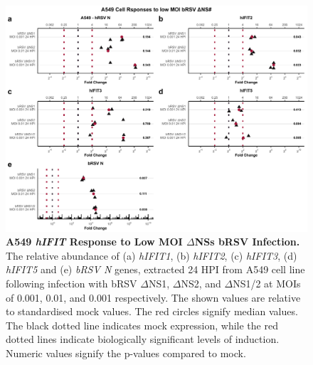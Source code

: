 \begin{figure}
    \centering
    \includegraphics[width=1\linewidth]{06. Chapter 1/Figs/01. Induction/08. a549_brsv_dns.pdf}
    \caption[A549 \textit{hIFIT} Response to Low MOI \(\Delta\)NSs bRSV Infection.]{\textbf{A549 \textit{hIFIT} Response to Low MOI \(\Delta\)NSs bRSV Infection.} The relative abundance of (a) \textit{hIFIT1}, (b) \textit{hIFIT2}, (c) \textit{hIFIT3}, (d) \textit{hIFIT5} and (e) \textit{bRSV N} genes, extracted 24 HPI from A549 cell line following infection with bRSV \(\Delta\)NS1, \(\Delta\)NS2, and \(\Delta\)NS1/2 at MOIs of 0.001, 0.01, and 0.001 respectively. The shown values are relative to standardised mock values. The red circles signify median values. The black dotted line indicates mock expression, while the red dotted lines indicate biologically significant levels of induction. Numeric values signify the p-values compared to mock.}
    \label{Responses of A549 to bRSV dNSs.}
\end{figure}

